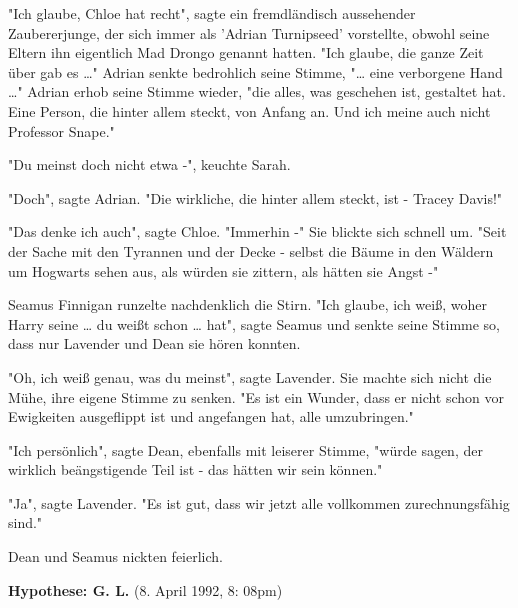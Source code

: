 {"Ich glaube, Chloe hat recht", sagte ein fremdländisch aussehender Zaubererjunge, der sich immer als 'Adrian Turnipseed' vorstellte, obwohl seine Eltern ihn eigentlich Mad Drongo genannt hatten. "Ich glaube, die ganze Zeit über gab es …" Adrian senkte bedrohlich seine Stimme, "… eine verborgene Hand …" Adrian erhob seine Stimme wieder, "die alles, was geschehen ist, gestaltet hat. Eine Person, die hinter allem steckt, von Anfang an. Und ich meine auch nicht Professor Snape."

"Du meinst doch nicht etwa -", keuchte Sarah.

"Doch", sagte Adrian. "Die wirkliche, die hinter allem steckt, ist - Tracey Davis!"

"Das denke ich auch", sagte Chloe. "Immerhin -" Sie blickte sich schnell um. "Seit der Sache mit den Tyrannen und der Decke - selbst die Bäume in den Wäldern um Hogwarts sehen aus, als würden sie zittern, als hätten sie Angst -"

Seamus Finnigan runzelte nachdenklich die Stirn. "Ich glaube, ich weiß, woher Harry seine … du weißt schon … hat", sagte Seamus und senkte seine Stimme so, dass nur Lavender und Dean sie hören konnten.

"Oh, ich weiß genau, was du meinst", sagte Lavender. Sie machte sich nicht die Mühe, ihre eigene Stimme zu senken. "Es ist ein Wunder, dass er nicht schon vor Ewigkeiten ausgeflippt ist und angefangen hat, alle umzubringen."

"Ich persönlich", sagte Dean, ebenfalls mit leiserer Stimme, "würde sagen, der wirklich beängstigende Teil ist - das hätten wir sein können."

"Ja", sagte Lavender. "Es ist gut, dass wir jetzt alle vollkommen zurechnungsfähig sind."

Dean und Seamus nickten feierlich.

\textbf{Hypothese: G. L.} (8. April 1992, 8: 08pm)

}
